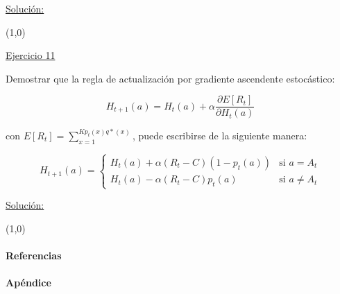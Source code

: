 \documentclass[12pt]{article}
\newlength\tindent
\renewcommand{\indent}{\hspace*{\tindent}}
\begin{document}
    \indent\underline{Solución:}

    \lipsum[2]

    \line(1,0){\textwidth}

    \indent\underline{Ejercicio 11}

    Demostrar que la regla de actualización por gradiente ascendente estocástico:

    \[H_{t+1}(a) = H_t (a) + \alpha \frac{\partial E[R_t] }{\partial H_t(a)}\]

    con $E[R_t] = \sum_{x=1}^{K p_t(x)q*(x)}$, puede escribirse de la siguiente manera:

    \[
        H_{t+1}(a) =
        \begin{cases}
            H_t (a) + \alpha (R_t - C)(1-p_t(a))    &\text{si $a = A_t$} \\
            H_t (a) - \alpha (R_t - C)p_t(a)        &\text{si $a \neq A_t$}
        \end{cases}
    \]

    \indent\underline{Solución:}

    \lipsum[5]

    \line(1,0){\textwidth}

    \paragraph{Referencias}\label{sec:references}
    \lipsum[5]

    \paragraph{Apéndice}\label{sec:appendix}

    \lipsum[5]
\end{document}
